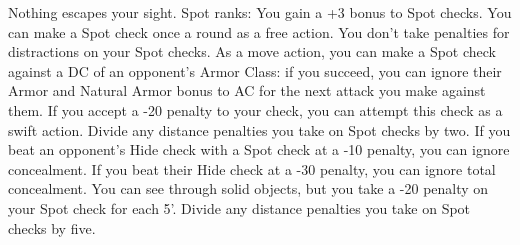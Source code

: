 \skillfeat
{Nothing escapes your sight.}
{Spot ranks:}
{You gain a +3 bonus to Spot checks.}
{You can make a Spot check once a round as a free action. You don't take penalties for distractions on your Spot checks.}
{As a move action, you can make a Spot check against a DC of an opponent's Armor Class: if you succeed, you can ignore their Armor and Natural Armor bonus to AC for the next attack you make against them. If you accept a -20 penalty to your check, you can attempt this check as a swift action. Divide any distance penalties you take on Spot checks by two.}
{If you beat an opponent's Hide check with a Spot check at a -10 penalty, you can ignore concealment. If you beat their Hide check at a -30 penalty, you can ignore total concealment.}
{You can see through solid objects, but you take a -20 penalty on your Spot check for each 5'. Divide any distance penalties you take on Spot checks by five.}